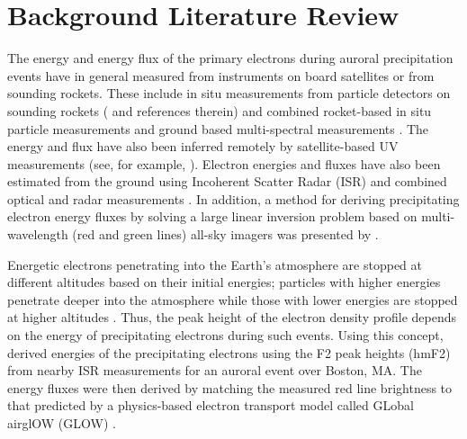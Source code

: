 \section{Background Literature Review}

The energy and energy flux of the primary electrons during auroral precipitation events have in general measured from instruments on board satellites or  from sounding rockets. These include in situ measurements from particle detectors on sounding rockets (\citet{rocket,michell_2016} and references therein) and combined rocket-based in situ particle measurements and ground based multi-spectral measurements \citep{grubbs_multi_spec}. The energy and flux have also been inferred remotely by satellite-based UV measurements (see, for example, \citet{guvi}).
Electron energies and fluxes have also been estimated from the ground using Incoherent Scatter Radar (ISR) \citep{semeter_2005} and combined optical and radar measurements \citep{pallamraju_2011}. In addition, a method for deriving precipitating electron energy fluxes by solving a large linear inversion problem based on multi-wavelength (red and green lines) all-sky imagers was presented by \citet{jan_rcons2001}.

Energetic electrons penetrating into the Earth's atmosphere are stopped at different altitudes based on their initial energies; particles with higher energies penetrate deeper into the atmosphere while those with lower energies are stopped at higher altitudes \citep{rees_1963}.
Thus, the peak height of the electron density profile depends on the energy of precipitating electrons during such events.
Using this concept, \cite{pallamraju_2011} derived energies of the precipitating electrons using the F2 peak heights (hmF2) from nearby ISR measurements for an auroral event over Boston, MA. The energy fluxes were then derived by matching the measured red line brightness to that predicted by a physics-based electron transport model called GLobal airglOW (GLOW) \citep{solomon_1988,solomon1989630,bailey2002}.  

